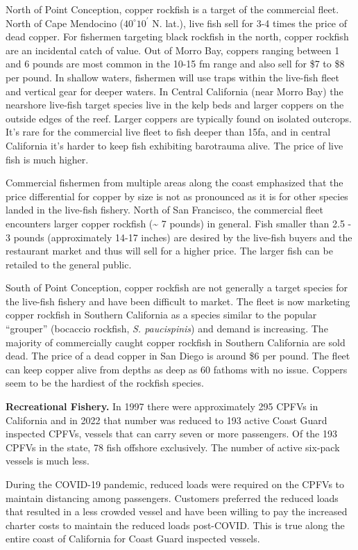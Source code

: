 \documentclass[11pt,
  english,
  letterpaper,
]{article}
\begin{document}
North of Point Conception, copper rockfish is a target of the commercial fleet. North of Cape Mendocino ($40^\circ 10^\prime$ N. lat.), live fish sell for 3-4 times the price of dead copper. For fishermen targeting black rockfish in the north, copper rockfish are an incidental catch of value. Out of Morro Bay, coppers ranging between 1 and 6 pounds are most common in the 10-15 fm range and also sell for \$7 to \$8 per pound. In shallow waters, fishermen will use traps within the live-fish fleet and vertical gear for deeper waters. In Central California (near Morro Bay) the nearshore live-fish target species live in the kelp beds and larger coppers on the outside edges of the reef. Larger coppers are typically found on isolated outcrops. It's rare for the commercial live fleet to fish deeper than 15fa, and in central California it's harder to keep fish exhibiting barotrauma alive. The price of live fish is much higher.

Commercial fishermen from multiple areas along the coast emphasized that the price differential for copper by size is not as pronounced as it is for other species landed in the live-fish fishery. North of San Francisco, the commercial fleet encounters larger copper rockfish (\textasciitilde{} 7 pounds) in general. Fish smaller than 2.5 - 3 pounds (approximately 14-17 inches) are desired by the live-fish buyers and the restaurant market and thus will sell for a higher price. The larger fish can be retailed to the general public.

South of Point Conception, copper rockfish are not generally a target species for the live-fish fishery and have been difficult to market. The fleet is now marketing copper rockfish in Southern California as a species similar to the popular ``grouper'' (bocaccio rockfish, \emph{S. paucispinis}) and demand is increasing. The majority of commercially caught copper rockfish in Southern California are sold dead. The price of a dead copper in San Diego is around \$6 per pound. The fleet can keep copper alive from depths as deep as 60 fathoms with no issue. Coppers seem to be the hardiest of the rockfish species.

\textbf{Recreational Fishery.} In 1997 there were approximately 295 CPFVs in California and in 2022 that number was reduced to 193 active Coast Guard inspected CPFVs, vessels that can carry seven or more passengers. Of the 193 CPFVs in the state, 78 fish offshore exclusively. The number of active six-pack vessels is much less.

During the COVID-19 pandemic, reduced loads were required on the CPFVs to maintain distancing among passengers. Customers preferred the reduced loads that resulted in a less crowded vessel and have been willing to pay the increased charter costs to maintain the reduced loads post-COVID. This is true along the entire coast of California for Coast Guard inspected vessels.
\end{document}
